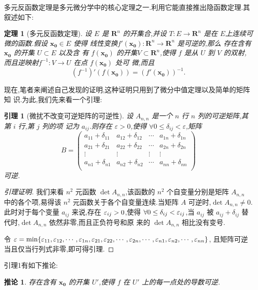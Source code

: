 \documentclass[twoside,11pt]{article}
\newtheorem{theorem}{定理}
\newtheorem{lemma}{引理}
\newtheorem{corollary}{推论}[lemma]
\begin{document}
多元反函数定理是多元微分学中的核心定理之一.利用它能直接推出隐函数定理.其
叙述如下:
\begin{theorem}[多元反函数定理]
  设 $E$ 是 $\mathbf{R}^n$ 的开集合,并设 $T:E\to
  \mathbf{R}^n$ 是在 $E$上连续可微的函数.假设 $\mathbf{x_0}\in E$ 使得
  线性变换$f'(\mathbf{x_0}):\mathbf{R}^n\to \mathbf{R}^n$ 是可逆的,那么
  存在含有$\mathbf{x_0}$ 的开集 $U\subset E$ 以及含
  有 $f(\mathbf{x_0})$ 的开集$V\subset \mathbf{R}^n$,使得 $f$ 是从 $U$
  到 $V$ 的双射,而且逆映射$f^{-1}:V\to U$ 在点 $f(\mathbf{x_0})$ 处可
  微,而且
$$
(f^{-1})'(f(\mathbf{x_0}))=(f'(\mathbf{x_0}))^{-1}.
$$
\end{theorem}
\bigskip\bigskip
现在,笔者来阐述自己发现的证明,这种证明只用到了微分中值定理以及简单的矩阵知
识.为此,我们先来看一个引理:
\begin{lemma}[微扰不改变可逆矩阵的可逆性]
  设 $A_{n,n}$ 是一个 $n$ 行 $n$ 列的可逆矩阵,其第 $i$ 行,第 $j$ 列的项
  记为 $a_{ij}$.则存在 $\varepsilon>0$,使得 $\forall 0\leq
  \delta_{ij}<\varepsilon$,矩阵
$$
B=\begin{pmatrix}
  a_{11}+\delta_{11}&a_{12}+\delta_{12}&\cdots&a_{1n}+\delta_{1n}\\
  a_{21}+\delta_{21}&a_{22}+\delta_{22}&\cdots&a_{2n}+\delta_{2n}\\
  \vdots&\vdots&\vdots&\vdots\\
  a_{n1}+\delta_{n1}&a_{n2}+\delta_{n2}&\cdots&a_{nn}+\delta_{nn}\\
\end{pmatrix}
$$
可逆.
\end{lemma}
\begin{proof}[引理证明]
 我们来看 $n^2$ 元函数 $\det A_{n,n}$,该函数的 $n^2$ 个自变量分别是矩阵
 $A_{n,n}$ 中的各个项,易得该 $n^2$ 元函数关于各个自变量连续.当矩阵 $A$
 可逆时,$\det A_{n,n}\neq 0$.此时对于每个变量 $a_{ij}$ 来说,存在
 $\varepsilon_{ij}>0$,使得 $\forall 0\leq\delta_{ij}<\varepsilon_{ij}$,当 $a_{ij}$ 被
 $a_{ij}+\delta_{ij}$ 替代时,$\det A_{n,n}$ 依然非零,而且正负符号和原
 来的 $\det A_{n,n}$ 相比没有变号.

令 $\varepsilon=\min
\{\varepsilon_{11},\varepsilon_{12},\cdots,\varepsilon_{1n},\varepsilon_{21},\varepsilon_{22},\cdots,\varepsilon_{2n},\cdots,\varepsilon_{n1},\varepsilon_{n2},\cdots,\varepsilon_{nn}\}$,
且矩阵可逆当且仅当行列式非零,即可得引理.
\end{proof}
\bigskip
引理1有如下推论:

\begin{corollary}
存在含有 $\mathbf{x_0}$ 的开集 $U'$,使得 $f$ 在 $U'$ 上的每一点处的导数可逆.
\end{corollary}
\end{document}
